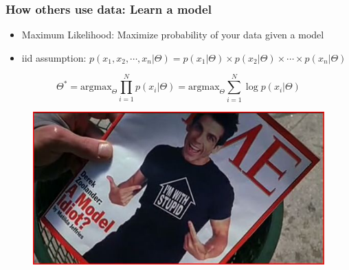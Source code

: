 \documentclass{beamer}
\begin{document}

\begin{frame}
	\frametitle{How others use data: Learn a model}
	\begin{itemize}
		\item Maximum Likelihood: Maximize probability of your data given a model
		\item iid assumption: $p(x_1,x_2, \cdots , x_n | \Theta) = p(x_1|\Theta)\times p(x_2|\Theta) \times \cdots \times p(x_n|\Theta)$
	\end{itemize}
	$$\Theta^* = \mathrm{argmax}_\Theta  \prod_{i=1}^N p(x_i | \Theta) = \mathrm{argmax}_\Theta  \sum_{i=1}^N \log p(x_i | \Theta) $$
	\begin{figure}
		\centering
		\includegraphics[width=0.5\linewidth]{model_idiot}
	\end{figure}
\end{frame}

\end{document}
